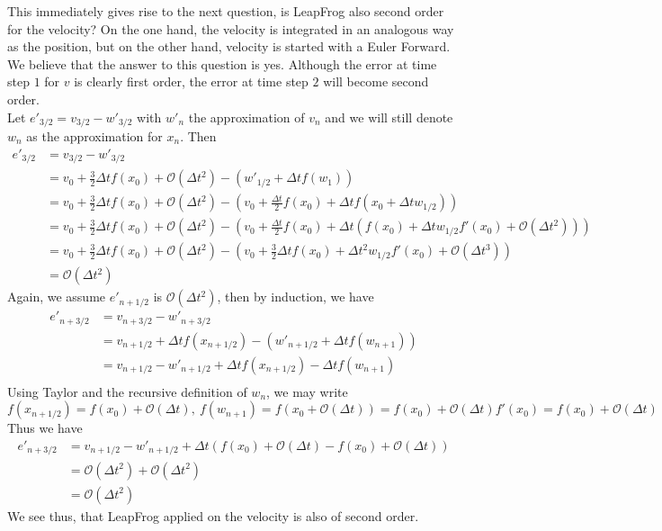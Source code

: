 This immediately gives rise to the next question, is LeapFrog also second order for the velocity? On the one hand, the velocity is integrated in an analogous way as the position, but on the other hand, velocity is started with a Euler Forward. We believe that the answer to this question is yes. Although the error at time step $1$ for $v$ is clearly first order, the error at time step $2$ will become second order.\\

Let $e'_{3/2}=v_{3/2}-w'_{3/2}$ with $w'_n$ the approximation of $v_n$ and we will still denote $w_n$ as the approximation for $x_n$. Then
\begin{align*}
e'_{3/2}&=v_{3/2}-w'_{3/2}\\
		&=v_0+\frac{3}{2}\Delta t f(x_0)+\mathcal{O}(\Delta t^2)-(w'_{1/2}+\Delta t f(w_1))\\
		&=v_0+\frac{3}{2}\Delta t f(x_0)+\mathcal{O}(\Delta t^2)-(v_0+\frac{\Delta t}{2}f(x_0)+\Delta t f(x_0+\Delta t w_{1/2}))\\
		&=v_0+\frac{3}{2}\Delta t f(x_0)+\mathcal{O}(\Delta t^2)-(v_0+\frac{\Delta t}{2}f(x_0)+\Delta t (f(x_0)+\Delta t w_{1/2}f'(x_0)+\mathcal{O}(\Delta t^2)))\\
		&=v_0+\frac{3}{2}\Delta t f(x_0)+\mathcal{O}(\Delta t^2)-(v_0+\frac{3}{2}\Delta tf(x_0)+\Delta t^2 w_{1/2}f'(x_0)+\mathcal{O}(\Delta t^3))\\
		&=\mathcal{O}(\Delta t^2)
\end{align*}
Again, we assume $e'_{n+1/2}$ is $\mathcal{O}(\Delta t^2)$, then by induction, we have
\begin{align*}
e'_{n+3/2}&=v_{n+3/2}-w'_{n+3/2}\\
		  &=v_{n+1/2}+\Delta t f(x_{n+1/2})-(w'_{n+1/2}+\Delta t f(w_{n+1}))\\
		  &=v_{n+1/2}-w'_{n+1/2}+\Delta tf(x_{n+1/2})-\Delta tf(w_{n+1})\\
\end{align*}
Using Taylor and the recursive definition of $w_n$, we may write
\[f(x_{n+1/2})=f(x_0)+\mathcal{O}(\Delta t),~f(w_{n+1})=f(x_0+\mathcal{O}(\Delta t))=f(x_0)+\mathcal{O}(\Delta t)f'(x_0)=f(x_0)+\mathcal{O}(\Delta t)\]
Thus we have
\begin{align*}
e'_{n+3/2}&=v_{n+1/2}-w'_{n+1/2}+\Delta t(f(x_0)+\mathcal{O}(\Delta t)-f(x_0)+\mathcal{O}(\Delta t))\\
		  &=\mathcal{O}(\Delta t^2)+\mathcal{O}(\Delta t^2)\\
		  &=\mathcal{O}(\Delta t^2)
\end{align*}
We see thus, that LeapFrog applied on the velocity is also of second order.


